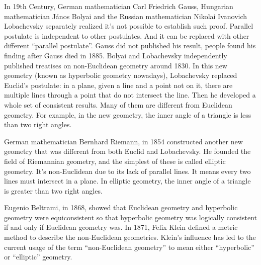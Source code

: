 \documentclass{article}
\begin{document}
In 19th Century, German mathematician Carl Friedrich Gauss, Hungarian mathematician János Bolyai and the Russian mathematician Nikolai Ivanovich Lobachevsky separately realized it's not possible to establish such proof. Parallel postulate is independent to other postulates. And it can be replaced with other different ``parallel postulate''. Gauss did not published his result, people found his finding after Gauss died in 1885. Bolyai and Lobachevsky independently published treatises on non-Euclidean geometry around 1830. In this new geometry (known as hyperbolic geometry nowadays), Lobachevsky replaced Euclid's postulate: in a plane, given a line and a point not on it, there are multiple lines through a point that do not intersect the line. Then he developed a whole set of consistent results. Many of them are different from Euclidean geometry. For example, in the new geometry, the inner angle of a triangle is less than two right angles.

German mathematician Bernhard Riemann, in 1854 constructed another new geometry that was different from both Euclid and Lobachevsky. He founded the field of Riemannian geometry, and the simplest of these is called elliptic geometry. It's non-Euclidean due to its lack of parallel lines. It means every two lines must intersect in a plane. In elliptic geometry, the inner angle of a triangle is greater than two right angles.

Eugenio Beltrami, in 1868, showed that Euclidean geometry and hyperbolic geometry were equiconsistent so that hyperbolic geometry was logically consistent if and only if Euclidean geometry was. In 1871, Felix Klein defined a metric method to describe the non-Euclidean geometries. Klein's influence has led to the current usage of the term ``non-Euclidean geometry'' to mean either ``hyperbolic'' or ``elliptic'' geometry.
\end{document}
